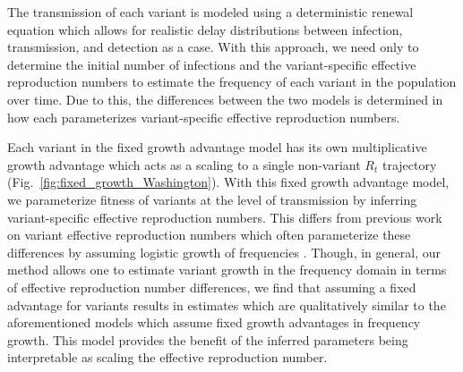 \documentclass[11pt,oneside,letterpaper]{article}
\begin{document}
The transmission of each variant is modeled using a deterministic renewal equation which allows for realistic delay distributions between infection, transmission, and detection as a case.
With this approach, we need only to determine the initial number of infections and the variant-specific effective reproduction numbers to estimate the frequency of each variant in the population over time.
Due to this, the differences between the two models is determined in how each parameterizes variant-specific effective reproduction numbers.

Each variant in the fixed growth advantage model has its own multiplicative growth advantage which acts as a scaling to a single non-variant $R_{t}$ trajectory (Fig.~\ref{fig:fixed_growth_Washington}).
With this fixed growth advantage model, we parameterize fitness of variants at the level of transmission by inferring variant-specific effective reproduction numbers.
This differs from previous work on variant effective reproduction numbers which often parameterize these differences by assuming logistic growth of frequencies \cite{Earnest2021, Vhringer2021}.
Though, in general, our method allows one to estimate variant growth in the frequency domain in terms of effective reproduction number differences, we find that assuming a fixed advantage for variants results in estimates which are qualitatively similar to the aforementioned models which assume fixed growth advantages in frequency growth.
This model provides the benefit of the inferred parameters being interpretable as scaling the effective reproduction number.
\end{document}
